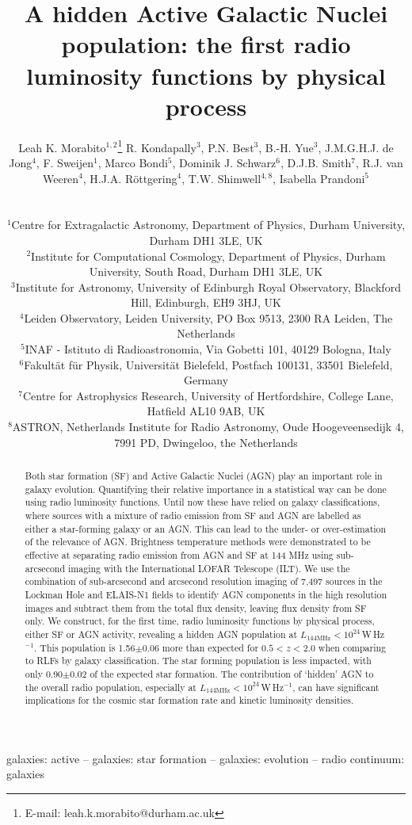 \documentclass[usenatbib,fleqn,letters]{mnras}
\title[A hidden AGN population]{A hidden Active Galactic Nuclei population: the first radio luminosity functions by physical process}
\author[L.K. Morabito]{\parbox{\textwidth}{Leah K. Morabito$^{1,2}$\thanks{E-mail: leah.k.morabito@durham.ac.uk}\orcidlink{0000-0003-0487-6651}
R. Kondapally$^{3}$\orcidlink{0000-0001-6127-8151},
P.N. Best$^{3}$\orcidlink{0000-0001-5081-4801},
B.-H. Yue$^{3}$\orcidlink{0009-0009-8935-2929}, 
J.M.G.H.J. de Jong$^{4}$\orcidlink{0000-0001-6876-8719},
F. Sweijen$^{1}$\orcidlink{0000-0002-6470-7967},
Marco Bondi$^{5}$\orcidlink{0000-0002-9553-7999},
Dominik J. Schwarz$^{6}$\orcidlink{0000-0003-2413-0881},
D.J.B. Smith$^{7}$\orcidlink{0000-0001-9708-253X},
R.J. van Weeren$^{4}$\orcidlink{0000-0002-0587-1660},
H.J.A. R\"{o}ttgering$^{4}$\orcidlink{0000-0001-8887-2257},
T.W. Shimwell$^{4,8}$\orcidlink{0000-0001-5648-9069},
Isabella Prandoni$^{5}$\orcidlink{0000-0001-9680-7092}
\\}\\ 
$^{1}$Centre for Extragalactic Astronomy, Department of Physics, Durham University, Durham DH1 3LE, UK \\
$^{2}$Institute for Computational Cosmology, Department of Physics, Durham University, South Road, Durham DH1 3LE, UK \\ 
$^{3}$Institute for Astronomy, University of Edinburgh Royal Observatory, Blackford Hill, Edinburgh, EH9 3HJ, UK \\
$^{4}$Leiden Observatory, Leiden University, PO Box 9513, 2300 RA Leiden, The Netherlands \\
$^{5}$INAF - Istituto di Radioastronomia, Via Gobetti 101, 40129 Bologna, Italy  \\
$^{6}$Fakult\"{a}t f\"{u}r Physik, Universit\"{a}t Bielefeld, Postfach 100131, 33501 Bielefeld, Germany \\
$^{7}$Centre for Astrophysics Research, University of Hertfordshire, College Lane, Hatfield AL10 9AB, UK \\
$^{8}$ASTRON, Netherlands Institute for Radio Astronomy, Oude Hoogeveensedijk 4, 7991 PD, Dwingeloo, the Netherlands \\}
\newcommand{\wphz}{$\,$W$\,$Hz$^{-1}$}
\newcommand{\llof}{$L_{\textrm{144MHz}}$}
\begin{document}
\date{}
\pagerange{\pageref{firstpage}--\pageref{lastpage}} 
\maketitle

\label{firstpage}

\begin{abstract}
Both star formation (SF) and Active Galactic Nuclei (AGN) play an important role in galaxy evolution. Quantifying their relative importance in a statistical way can be done using radio luminosity functions. Until now these have relied on galaxy classifications, where sources with a mixture of radio emission from SF and AGN are labelled as either a star-forming galaxy or an AGN. This can lead to the under- or over-estimation of the relevance of AGN. Brightness temperature methods were demonstrated to be effective at separating radio emission from AGN and SF at 144 MHz using sub-arcsecond imaging with the International LOFAR Telescope (ILT). We use the combination of sub-arcsecond and arcsecond resolution imaging of 7,497 sources in the Lockman Hole and ELAIS-N1 fields to identify AGN components in the high resolution images and subtract them from the total flux density, leaving flux density from SF only. We construct, for the first time, radio luminosity functions by physical process, either SF or AGN activity, revealing a hidden AGN population at \llof $<10^{24}$\wphz . This population is 1.56$\pm$0.06 more than expected for $0.5<z<2.0$ when comparing to RLFs by galaxy classification. The star forming population is less impacted, with only 0.90$\pm$0.02 of the expected star formation. The contribution of `hidden' AGN to the overall radio population, especially at \llof $<10^{24}$\wphz , can have significant implications for the cosmic star formation rate and kinetic luminosity densities.
\end{abstract}

\begin{keywords}
galaxies: active -- galaxies: star formation -- galaxies: evolution -- radio continuum: galaxies 
\vspace{3.7in}
\end{keywords}
\end{document}
